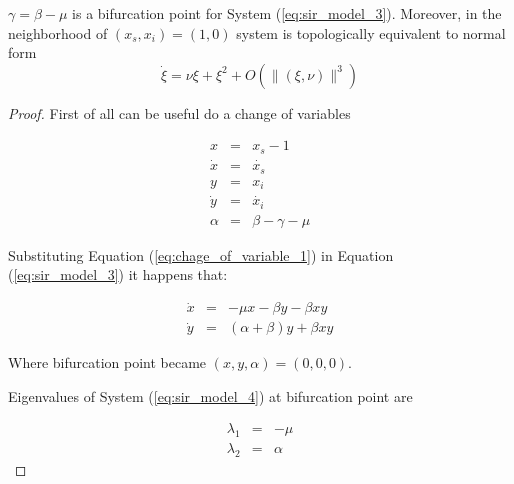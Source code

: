 \begin{theorem}
$\gamma = \beta-\mu$ is a bifurcation point for System (\ref{eq:sir_model_3}). Moreover, in the neighborhood of $(x_s,x_i) = (1,0)$ system is topologically equivalent to normal form
\begin{equation}
    \dot{\xi} = \nu\xi + \xi^2 + O\left(\|(\xi,\nu)\|^3\right)
\end{equation}
\end{theorem}

\begin{proof}

First of all can be useful do a change of variables

\begin{equation}
    \label{eq:chage_of_variable_1}
    \begin{array}{ccc}
    x &=& x_s - 1 \\
    \dot{x} &=& \dot{x_s} \\
    y &=& x_i \\
    \dot{y} &=& \dot{x_i} \\
    \alpha &=& \beta - \gamma - \mu
    \end{array}
\end{equation}

Substituting Equation (\ref{eq:chage_of_variable_1}) in Equation (\ref{eq:sir_model_3}) it happens that:

\begin{equation}
    \label{eq:sir_model_4}
    \begin{array}{ccc}
        \dot{x} &=& -\mu x -\beta y - \beta xy \\
        \dot{y} &=& (\alpha+\beta) y +\beta xy
    \end{array}
\end{equation}

Where bifurcation point became $(x,y,\alpha) = (0,0,0)$.

Eigenvalues of System (\ref{eq:sir_model_4}) at bifurcation point are

\begin{equation}
    \begin{array}{ccc}
        \lambda_1 &=& -\mu \\
        \lambda_2 &=& \alpha
    \end{array}
\end{equation}


\end{proof}
